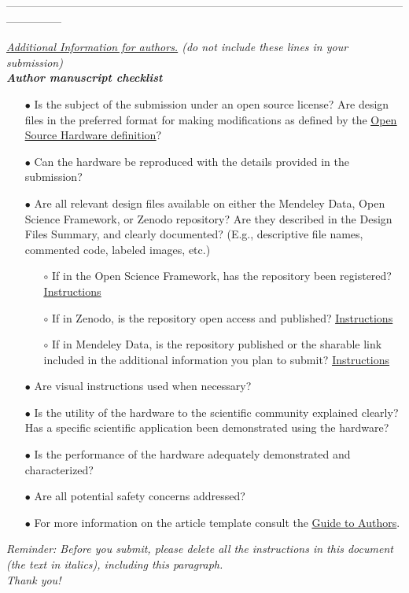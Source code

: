 \documentclass[11pt, letterpaper]{article}
\begin{document}
\begin{center}
---------------------------------------------------------------------------------------------------------------------------
\end{center}
{\it \underline{Additional Information for authors.} (do not include these lines in your submission)\\

\noindent
\textbf{Author manuscript checklist}
\begin{itemize}
\item[$\bullet$]Is the subject of the submission under an open source license? Are design files in the preferred format for making modifications as defined by the \href{http://www.oshwa.org/definition/}{\underline{Open Source Hardware definition}}?

\item[$\bullet$]Can the hardware be reproduced with the details provided in the submission?

\item[$\bullet$]Are all relevant design files available on either the Mendeley Data, Open Science Framework, or Zenodo repository? Are they described in the Design Files Summary, and clearly documented? (E.g., descriptive file names, commented code, labeled images, etc.)
\begin{itemize}
\item[$\circ$]If in the Open Science Framework, has the repository been registered? \href{https://osf.io/wgk7q/wiki/home/}{\underline{Instructions}}
\item[$\circ$]If in Zenodo, is the repository open access and published? \href{https://doi.org/10.5281/zenodo.3346799}{\underline{Instructions}}
\item[$\circ$]If in Mendeley Data, is the repository published or the sharable link included in the additional information you plan to submit? \href{https://doi.org/10.5281/zenodo.3346799}{\underline{Instructions}}
\end{itemize}
\item[$\bullet$]Are visual instructions used when necessary?

\item[$\bullet$]Is the utility of the hardware to the scientific community explained clearly? Has a specific scientific application been demonstrated using the hardware?

\item[$\bullet$]Is the performance of the hardware adequately demonstrated and characterized?

\item[$\bullet$]Are all potential safety concerns addressed?

\item[$\bullet$]For more information on the article template consult the \href{https://www.elsevier.com/journals/hardwarex/2468-0672/guide-for-authors}{\underline{Guide to Authors}}.
\end{itemize}}

\vskip 1.5cm
\begin{center}
{\Huge \it Reminder: Before you submit, please delete all
the instructions in this document (the text in italics), including this paragraph.\\
Thank you!}
\end{center}
\end{document}
